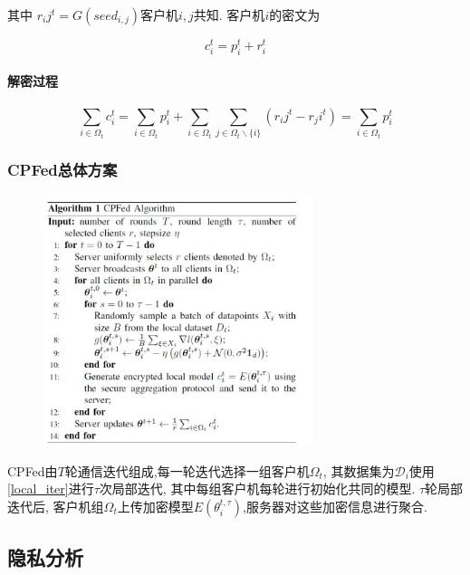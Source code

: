 \documentclass[a4paper]{article}
\theoremstyle{definition}
\numberwithin{equation}{section}
\begin{document}
其中 $r_ij^t=G(seed_{i,j})$客户机$i,j$共知. 客户机$i$的密文为

\begin{equation}
    c_i^t=p_i^t+ r_i^t 
\end{equation}

\paragraph{解密过程}

\begin{equation}
    \sum_{i \in \Omega_t} c_i^t=   \sum_{i \in \Omega_t} p_i^t +   \sum_{i \in \Omega_t}   \sum_{j \in \Omega_t \backslash\{i\}} (r_ij^t-r_ji^t) = \sum_{i \in \Omega_t} p_i^t 
\end{equation}

\subsubsection{CPFed总体方案}
\begin{figure}[ht]
    \setlength{\abovecaptionskip}{0.1cm}
    \centering    
    \includegraphics[width=0.7\textwidth]{CPFed/CPFed_Algorithm.jpg}
    \label{CPFed_algorithm}
\end{figure}

CPFed由$T$轮通信迭代组成,每一轮迭代选择一组客户机$\Omega_t$, 其数据集为$\mathcal{D}_i$使用\ref{local_iter}进行$\tau$次局部迭代, 其中每组客户机每轮进行初始化共同的模型. $\tau$轮局部迭代后, 客户机组$\Omega_t$上传加密模型$E(\theta_i^{t,\tau})$,服务器对这些加密信息进行聚合.

\subsection{隐私分析}
\end{document}
